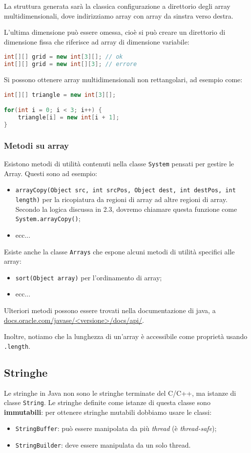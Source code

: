 \documentclass[a4paper,11pt]{article}
\begin{document}
La struttura generata sarà la classica configurazione a direttorio degli array multidimensionali, dove indirizziamo array con array da sinstra verso destra.

L'ultima dimensione può essere omessa, cioè si può creare un direttorio di dimensione fissa che riferisce ad array di dimensione variabile:
\begin{lstlisting}[language=java, style=codestyle]	
int[][] grid = new int[3][]; // ok
int[][] grid = new int[][3]; // errore
\end{lstlisting}

Si possono ottenere array multidimensionali non rettangolari, ad esempio come:
\begin{lstlisting}[language=java, style=codestyle]	
int[][] triangle = new int[3][];

for(int i = 0; i < 3; i++) {
	triangle[i] = new int[i + 1];
}
\end{lstlisting}

\subsubsection{Metodi su array}
Esistono metodi di utilità contenuti nella classe \lstinline|System| pensati per gestire le Array.
Questi sono ad esempio:
\begin{itemize}
	\item \lstinline|arrayCopy(Object src, int srcPos, Object dest, int destPos, int length)| per la ricopiatura da regioni di array ad altre regioni di array. Secondo la logica discussa in 2.3, dovremo chiamare questa funzione come \lstinline|System.arrayCopy()|;
	\item ecc...
\end{itemize}

Esiste anche la classe \lstinline|Arrays| che espone alcuni metodi di utilità specifici alle array:
\begin{itemize}
	\item \lstinline|sort(Object array)| per l'ordinamento di array;
	\item ecc...
\end{itemize}

Ulteriori metodi possono essere trovati nella documentazione di java, a \url{docs.oracle.com/javase/<versione>/docs/api/}.

Inoltre, notiamo che la lunghezza di un'array è accessibile come proprietà usando \lstinline|.length|.

\subsection{Stringhe}
Le stringhe in Java non sono le stringhe terminate del C/C++, ma istanze di classe \lstinline|String|.
Le stringhe definite come istanze di questa classe sono \textbf{immutabili}: per ottenere stringhe mutabili dobbiamo usare le classi:
\begin{itemize}
	\item \lstinline|StringBuffer|: può essere manipolata da più \textit{thread} (è \textit{thread-safe});
	\item \lstinline|StringBuilder|: deve essere manipulata da un solo thread.
\end{itemize}
\end{document}
